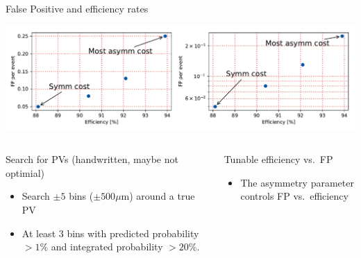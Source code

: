 \begin{frame}{False Positive and efficiency rates}

\includegraphics[width=\textwidth]{images/EffVsFP2.pdf}

  \begin{columns}[t]
  \begin{block}{Search for PVs (handwritten, maybe not optimial)}
    \begin{itemize}
    	\item Search $ \pm 5 $ bins ($ \pm 500 \mu $m) around a true PV
    	\item At least 3 bins with predicted probability
    	   $ > 1\% $ and
    	   integrated probability $ > 20\%$.
    \end{itemize}
    \end{block}

    \begin{block}{Tunable efficiency vs.\ FP}
    \begin{itemize}
        \item The asymmetry parameter controls FP vs.\ efficiency
    \end{itemize}
  \end{block}
\end{columns}
\end{frame}
